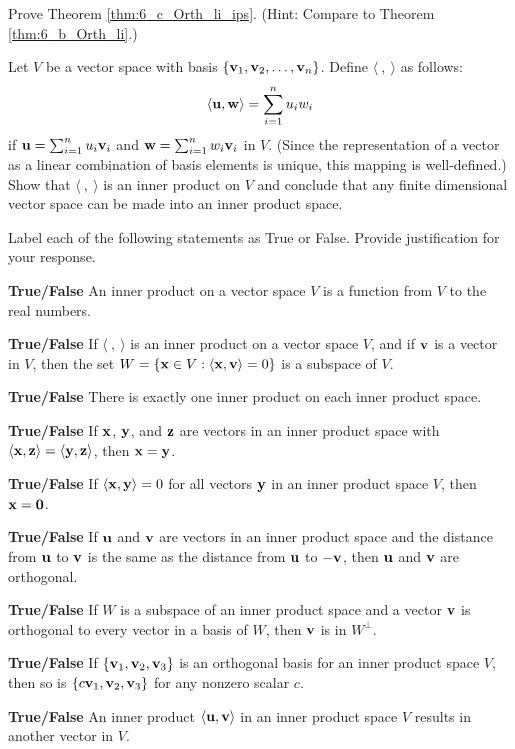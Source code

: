 \item Prove Theorem \ref{thm:6_c_Orth_li_ips}. (Hint: Compare to Theorem \ref{thm:6_b_Orth_li}.)

\item \label{ex_6_c_all_ips} Let $V$ be a vector space with basis $\{\mathbf{v}_1, \mathbf{v}_2, \ldots, \mathbf{v}_n\}$. Define $\langle \ , \ \rangle$ as follows:
\[\langle \mathbf{u}, \mathbf{w} \rangle = \sum_{i=1}^n u_iw_i\]
if $\mathbf{u} = \sum_{i=1}^n u_i \mathbf{v}_i$ and $\mathbf{w} = \sum_{i=1}^n w_i \mathbf{v}_i$ in $V$. (Since the representation of a vector as a linear combination of basis elements is unique, this mapping is well-defined.) Show that $\langle \ , \ \rangle$ is an inner product on $V$ and conclude that any finite dimensional vector space can be made into an inner product space. 

\item Label each of the following statements as True or False. Provide justification for your response.
	\ba
	\item \textbf{True/False} An inner product on a vector space $V$ is a function from $V$ to the real numbers. 
	\item \textbf{True/False} If $\langle \ , \ \rangle$ is an inner product on a vector space $V$, and if $\mathbf{v}$ is a vector in $V$, then the set $W = \{\mathbf{x} \in V : \langle \mathbf{x},\mathbf{v} \rangle = 0\}$ is a subspace of $V$.  
	\item \textbf{True/False} There is exactly one inner product on each inner product space.
	\item \textbf{True/False} If $\mathbf{x}$, $\mathbf{y}$, and $\mathbf{z}$ are vectors in an inner product space with $\langle \mathbf{x}, \mathbf{z} \rangle = \langle \mathbf{y}, \mathbf{z} \rangle$, then $\mathbf{x} = \mathbf{y}$. 
	\item \textbf{True/False} If $\langle \mathbf{x}, \mathbf{y} \rangle = 0$ for all vectors $\mathbf{y}$ in an inner product space $V$, then $\mathbf{x} = \mathbf{0}$. 
	\item \textbf{True/False} If $\mathbf{u}$ and $\mathbf{v}$ are vectors in an inner product space and the distance from $\mathbf{u}$ to $\mathbf{v}$ is the same as the distance from $\mathbf{u}$ to $-\mathbf{v}$, then $\mathbf{u}$ and $\mathbf{v}$ are orthogonal.
	\item \textbf{True/False} If $W$ is a subspace of an inner product space and a vector $\mathbf{v}$ is orthogonal to every vector in a basis of $W$, then $\mathbf{v}$ is in $W^{\perp}$.
	\item \textbf{True/False} If $\{\mathbf{v}_1, \mathbf{v}_2, \mathbf{v}_3\}$ is an orthogonal basis for an inner product space $V$, then so is $\{c\mathbf{v}_1, \mathbf{v}_2, \mathbf{v}_3\}$ for any nonzero scalar $c$. 
	\item \textbf{True/False} An inner product $\langle \mathbf{u}, \mathbf{v} \rangle$ in an inner product space $V$ results in another vector in $V$.
